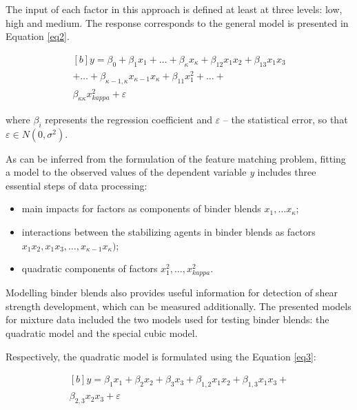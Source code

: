 \documentclass[eprint,
]{actapoly}
\begin{document}
The input of each factor in this approach is defined at least at three levels: low, high and medium. The response corresponds to the general model is presented in Equation \ref{eq2}.

\begin{equation}\label{eq2}
\begin{aligned}[b]
y=\beta_0+\beta_{1}x_{1}+\ldots+\beta_{\kappa}x_{\kappa}+\beta_{12}x_{1}x_{2}+\beta_{13}x_{1}x_3\\
+\ldots+\beta_{\kappa-1,\kappa}x_{\kappa-1}x_{\kappa}+\beta_{11}x_{1}^2+\ldots+ \\\beta_{\kappa\kappa}x_{kappa}^2+\varepsilon
\end{aligned}
\end{equation}

where $\beta_i$ represents the regression coefficient and $\varepsilon$ -- the statistical error, so that $\varepsilon\in N(0,\sigma^2)$.

As can be inferred from the formulation of the feature matching problem, fitting a model to the observed values of the dependent variable \emph{y} includes three essential steps of data processing: 

\begin{itemize}
	\item main impacts for factors as components of binder blends $x_1, \ldots x_\kappa$;
	\item interactions between the stabilizing agents in binder blends as factors $x_{1}x_{2}, x_{1}x_{3}, \ldots, x_{\kappa-1}x_{\kappa})$; 
	\item quadratic components of factors $x_{1}^2, \ldots, x_{kappa}^2$. 
\end{itemize}

Modelling binder blends also provides useful information for detection of shear strength development, which can be measured additionally. The presented models for mixture data included the two models used for testing binder blends: the quadratic model and the special cubic model. 

Respectively, the quadratic model is formulated using the Equation \ref{eq3}:

\begin{equation}\label{eq3}
\begin{aligned}[b]
y=\beta_{1}x_{1}+\beta_{2}x_{2}+\beta_{3}x_{3}+\beta_{1,2}x_{1}x_{2}+\beta_{1,3}x_{1}x_{3}+\\\beta_{2,3}x_{2}x_{3}+\varepsilon
\end{aligned}
\end{equation}
\end{document}
